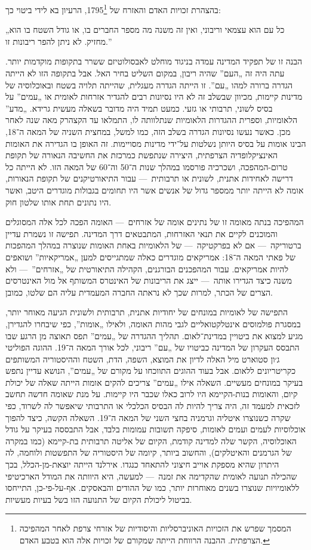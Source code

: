 בהצהרת זכויות האדם והאזרח של 1795\footnote{המסמך שפרש את הזכויות האוניברסליות והיסודיות של אזרחי צרפת לאחר המהפיכה הצרפתית. ההבנה הרווחת הייתה שמקורם של זכויות אלה הוא בטבע האדם.}, הרעיון בא לידי ביטוי כך: 

„כל עם הוא עצמאי וריבוני, ואין זה משנה מה מספר החברים בו, או גודל השטח בו הוא מחזיק. לא ניתן להפר ריבונות זו.”

הבנה זו של תפקיד המדינה עמדה בניגוד מוחלט לאבסולוטיזם ששרר בתקופות מוקדמות יותר. עתה היה זה „העם” שהיה ריבון, במקום השליט בחיר האל. אבל בתקופה הזו לא הייתה הגדרה ברורה למהו „עם”. זו הייתה הגדרה מעגלית, שהייתה תלויה בשטח ובאוכלוסיה של מדינות קיימות, מכיוון שבשלב זה לא היו נסיונות רבים להגדיר אזרחות לאומית או „עמים” על בסיס לשוני, תרבותי או גזעי. כמעט תמיד היה מדובר בשאלה מעשית גרידא. „מדע” הלאומיות, וספרית ההגדרות הלאומיות שנתלוותה לו, התמלאו עד הקצהרק מאה שנה לאחר מכן. כאשר נעשו נסיונות הגדרה בשלב הזה, כמו למשל, במחצית השניה של המאה ה־18, הבינו אומות על בסיס היותן נשלטות על־ידי מדינות מסויימות. זה האופן בו הגדירה את האומות האינציקלופדיה הצרפתית, היצירה שנתפשת כמרכזת את החשיבה הנאורה של תקופת טרום-המהפכה, ושכרכיה פורסמו במהלך שנות ה־50 וה־60 של המאה הזו. לא הייתה כל דרישה לאחידות אתנית, לשונית או תרבותית~— עבור התיאורטיקנים של תקופת הנאורות, אומה לא הייתה יותר ממספר גדול של אנשים אשר היו תחומים בגבולות מוגדרים היטב, ואשר היו נתונים תחת אותו שלטון חוק.

המהפיכה בנתה מאומה זו של נתינים אומה של אזרחים~— האומה הפכה לכל אלה המסוגלים והמוכנים לקיים את תנאי האזרחות, המתבטאים דרך המדינה. תפישה זו נשמרת עדיין ברטוריקה~— אם לא בפרקטיקה~— של הלאומיות באחת האומות שנוצרה במהלך המהפכות של פאתי המאה ה־18: אמריקאים מוגדרים כאלה שמתגייסים למען „אמריקאיות” ושואפים להיות אמריקאים. עבור המהפכנים הבורגנים, הקהילה התיאורטית של „אזרחים”~— ולא משנה כיצד הגדירו אותה~— ייצג את הריבונות של האינטרס המשותף אל מול האינטרסים הצרים של הכתר, למרות שכך לא נראתה החברה המעמדית עליה הם שלטו, כמובן.

התפישה של לאומיות במונחים של יחודיות אתנית, תרבותית ולשונית הגיעה מאוחר יותר, במסגרת פולמוסים אינטלקטואליים לגבי מהות האומה, ולאילו „אומות”, כפי שיבחרו להגדירן, מגיע למצוא את ביטויין במדינת־לאום. תהליך ההגדרה של „עמים” תפס תאוצה מן הרגע שבו התבסס העקרון של המדינה כביטויו של „עם” ריבוני, לכל אורך המאה ה־19. ההוגה הפוליטי ג׳ון סטוארט מיל האלה לדיון את המוצא, השפה, הדת, השטח וההיסטוריה המשותפים כקריטריונים ללאום. אבל בעוד ההוגים התווכחו על מקורם של „עמים”, הנושא עדיין נתפש בעיקר במונחים מעשיים. השאלה אילו „עמים” צריכים להקים אומות הייתה שאלה של יכולת קיום, והאומות בנות-הקיימא היו לרוב כאלו שכבר היו קיימות. על מנת שאומה חדשה תחשב לזכאית למעמד זה, היה צריך להיות לה הבסיס הכלכלי או התרבותי שיאפשר לה לשרוד, כפי שקרה כשנוצרו איטליה וגרמניה בחצי השני של המאה ה־19. השאלה הקשה, כיצד להפוך אוכלוסיות לעמים ועמים לאומות, סיפקה תשובות עמומות בלבד, אבל התבססה בעיקר על גודל האוכלוסיה, הקשר שלה למדינה קודמת, הקיום של אליטה תרבותית בת-קיימא (כמו במקרה של הגרמנים והאיטלקים), והחשוב ביותר, קיומה של היסטוריה של התפשטות ולוחמה, לה היתרון שהיא מספקת אוייב חיצוני להתאחד כנגדו. אירלנד הייתה יוצאת-מן-הכלל, בכך שהכילה תנועה לאומית שהקדימה את זמנה~— למעשה, היא היוותה את המודל הארכיטיפי ללאומיויות שנוצרו בשנים מאוחרות יותר, כמו של ההודים והבאסקים. אף-על-פי-כן, התייחסו בביטול ליכולת הקיום של התנועה הזו בשל בעיות מעשיות.

